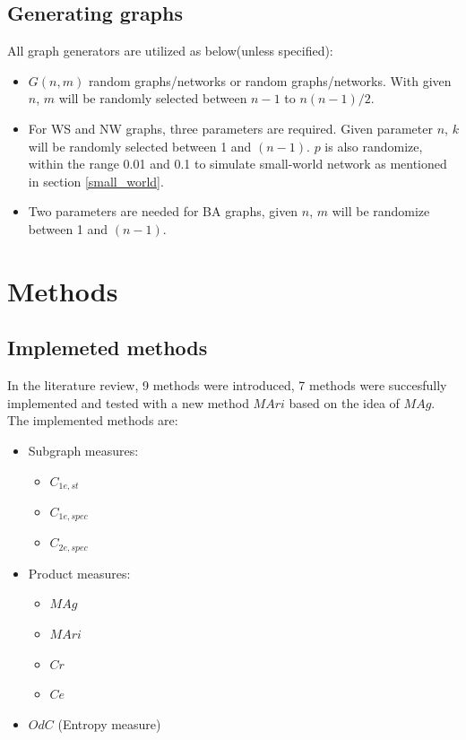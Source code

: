 \documentclass[12pt]{article}
\begin{document}
\subsection{Generating graphs}
\label{generate_graphs}
All graph generators are utilized as below(unless specified):
\begin{itemize}
    \item $G(n,m)$ random graphs/networks or random graphs/networks. With given $n$, $m$ will be randomly selected between $n-1$ to $n(n-1)/2$.
    \item For WS and NW graphs, three parameters are required. Given parameter $n$, $k$ will be randomly selected between 1 and $(n-1)$. $p$ is also randomize, within the range 0.01 and 0.1 to simulate small-world network as mentioned in section \ref{small_world}.
    \item Two parameters are needed for BA graphs, given $n$, $m$ will be randomize between 1 and $(n-1)$.
\end{itemize}

\section{Methods}
\subsection{Implemeted methods}
In the literature review, 9 methods were introduced, 7 methods were succesfully implemented and tested with a new method $MAri$ based on the idea of $MAg$. The implemented methods are:
\begin{itemize}
    \item Subgraph measures:
    \begin{itemize}
        \item $C_{1e,st}$
        \item $C_{1e,spec}$
        \item $C_{2e,spec}$
    \end{itemize}
    \item Product measures:
    \begin{itemize}
        \item $MAg$
        \item $MAri$
        \item $Cr$
        \item $Ce$
    \end{itemize}
    \item $OdC$ (Entropy measure)
\end{itemize}
\end{document}
